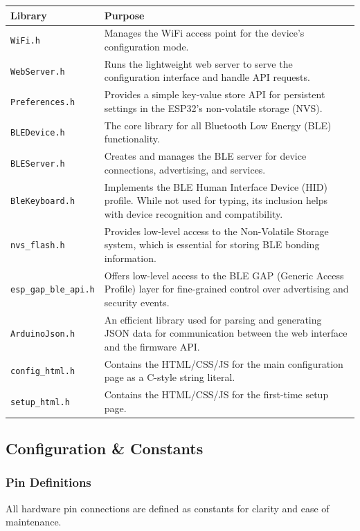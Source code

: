 \documentclass{article}
\begin{document}
\begin{center}
\begin{longtable}{|l|p{}|}
\hline
\textbf{Library} & \textbf{Purpose} \\
\hline
\endhead
\texttt{WiFi.h} & Manages the WiFi access point for the device's configuration mode. \\
\hline
\texttt{WebServer.h} & Runs the lightweight web server to serve the configuration interface and handle API requests. \\
\hline
\texttt{Preferences.h} & Provides a simple key-value store API for persistent settings in the ESP32's non-volatile storage (NVS). \\
\hline
\texttt{BLEDevice.h} & The core library for all Bluetooth Low Energy (BLE) functionality. \\
\hline
\texttt{BLEServer.h} & Creates and manages the BLE server for device connections, advertising, and services. \\
\hline
\texttt{BleKeyboard.h} & Implements the BLE Human Interface Device (HID) profile. While not used for typing, its inclusion helps with device recognition and compatibility. \\
\hline
\texttt{nvs\_flash.h} & Provides low-level access to the Non-Volatile Storage system, which is essential for storing BLE bonding information. \\
\hline
\texttt{esp\_gap\_ble\_api.h} & Offers low-level access to the BLE GAP (Generic Access Profile) layer for fine-grained control over advertising and security events. \\
\hline
\texttt{ArduinoJson.h} & An efficient library used for parsing and generating JSON data for communication between the web interface and the firmware API. \\
\hline
\texttt{config\_html.h} & Contains the HTML/CSS/JS for the main configuration page as a C-style string literal. \\
\hline
\texttt{setup\_html.h} & Contains the HTML/CSS/JS for the first-time setup page. \\
\hline
\end{longtable}
\end{center}

\subsection{Configuration \& Constants}

\subsubsection{Pin Definitions}
All hardware pin connections are defined as constants for clarity and ease of maintenance.
\end{document}
